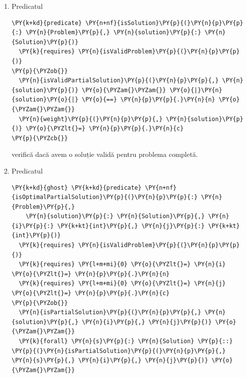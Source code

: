 \begin{sloppypar}
\begin{enumerate}
\begin{Verbatim}[commandchars=\\\{\}]
  \PY{k}{requires} \PY{l+m+mi}{0} \PY{o}{\PYZlt{}=} \PY{n}{j} \PY{o}{\PYZlt{}=} \PY{n}{p}\PY{p}{.}\PY{n}{c}
\PY{p}{\PYZob{}}
  \PY{n}{isValidPartialSolution}\PY{p}{(}\PY{n}{p}\PY{p}{,} \PY{n}{solution}\PY{p}{)} \PY{o}{\PYZam{}\PYZam{}} \PY{o}{|}\PY{n}{solution}\PY{o}{|} \PY{o}{==} \PY{n}{i} \PY{o}{\PYZam{}\PYZam{}}
  \PY{n}{weight}\PY{p}{(}\PY{n}{p}\PY{p}{,} \PY{n}{solution}\PY{p}{)} \PY{o}{\PYZlt{}=} \PY{n}{j}
\PY{p}{\PYZcb{}}
\end{Verbatim}
    vine în completarea predicatului  și pe lângă proprietățile aduse de acesta, verifică dacă soluția este validă pentru subproblema $(i, j)$.
    \item Predicatul 
    \begin{Verbatim}[commandchars=\\\{\}]
\PY{k+kd}{predicate} \PY{n+nf}{isSolution}\PY{p}{(}\PY{n}{p}\PY{p}{:} \PY{n}{Problem}\PY{p}{,} \PY{n}{solution}\PY{p}{:} \PY{n}{Solution}\PY{p}{)}
  \PY{k}{requires} \PY{n}{isValidProblem}\PY{p}{(}\PY{n}{p}\PY{p}{)}
\PY{p}{\PYZob{}}
  \PY{n}{isValidPartialSolution}\PY{p}{(}\PY{n}{p}\PY{p}{,} \PY{n}{solution}\PY{p}{)} \PY{o}{\PYZam{}\PYZam{}} \PY{o}{|}\PY{n}{solution}\PY{o}{|} \PY{o}{==} \PY{n}{p}\PY{p}{.}\PY{n}{n} \PY{o}{\PYZam{}\PYZam{}}
  \PY{n}{weight}\PY{p}{(}\PY{n}{p}\PY{p}{,} \PY{n}{solution}\PY{p}{)} \PY{o}{\PYZlt{}=} \PY{n}{p}\PY{p}{.}\PY{n}{c}
\PY{p}{\PYZcb{}}
\end{Verbatim} 
    verifică dacă avem o soluție validă pentru problema completă.
    \item Predicatul 
    \begin{Verbatim}[commandchars=\\\{\}]
\PY{k+kd}{ghost} \PY{k+kd}{predicate} \PY{n+nf}{isOptimalPartialSolution}\PY{p}{(}\PY{n}{p}\PY{p}{:} \PY{n}{Problem}\PY{p}{,} 
    \PY{n}{solution}\PY{p}{:} \PY{n}{Solution}\PY{p}{,} \PY{n}{i}\PY{p}{:} \PY{k+kt}{int}\PY{p}{,} \PY{n}{j}\PY{p}{:} \PY{k+kt}{int}\PY{p}{)}
  \PY{k}{requires} \PY{n}{isValidProblem}\PY{p}{(}\PY{n}{p}\PY{p}{)}
  \PY{k}{requires} \PY{l+m+mi}{0} \PY{o}{\PYZlt{}=} \PY{n}{i} \PY{o}{\PYZlt{}=} \PY{n}{p}\PY{p}{.}\PY{n}{n}
  \PY{k}{requires} \PY{l+m+mi}{0} \PY{o}{\PYZlt{}=} \PY{n}{j} \PY{o}{\PYZlt{}=} \PY{n}{p}\PY{p}{.}\PY{n}{c}
\PY{p}{\PYZob{}}
  \PY{n}{isPartialSolution}\PY{p}{(}\PY{n}{p}\PY{p}{,} \PY{n}{solution}\PY{p}{,} \PY{n}{i}\PY{p}{,} \PY{n}{j}\PY{p}{)} \PY{o}{\PYZam{}\PYZam{}}
  \PY{k}{forall} \PY{n}{s}\PY{p}{:} \PY{n}{Solution} \PY{p}{::} \PY{p}{(}\PY{n}{isPartialSolution}\PY{p}{(}\PY{n}{p}\PY{p}{,} \PY{n}{s}\PY{p}{,} \PY{n}{i}\PY{p}{,} \PY{n}{j}\PY{p}{)} \PY{o}{\PYZam{}\PYZam{}} 

\end{Verbatim}
\end{enumerate}
\end{sloppypar}
